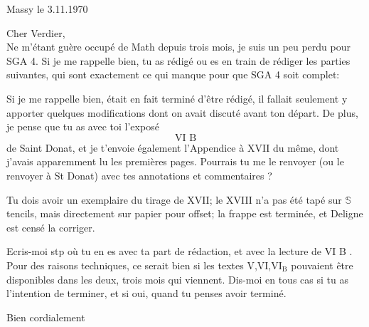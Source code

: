 \begin{flushright}
Massy le 3.11.1970\\
\end{flushright}
Cher Verdier,\\

Ne m'étant guère occupé de Math depuis trois mois, je suis un peu perdu pour SGA 4. Si je me rappelle bien, tu as rédigé ou es en train de rédiger les parties suivantes, qui sont exactement ce qui manque pour que SGA 4 soit complet:

Si je me rappelle bien,  était en fait terminé d'être rédigé, il fallait seulement y apporter quelques modifications dont on avait discuté avant ton départ. De plus, je pense que tu as avec toi l'exposé
\[
\text{VI B}
\]
de Saint Donat, et je t'envoie également l'Appendice à XVII du même, dont j'avais apparemment lu les premières pages. Pourrais tu me le renvoyer (ou le renvoyer à St Donat) avec tes annotations et commentaires ?

Tu dois avoir un exemplaire du tirage de XVII; le XVIII n'a pas été tapé sur \(\mathbb{S}\)tencils, mais directement sur papier pour offset; la frappe est terminée, et Deligne est censé la corriger.

Ecris-moi stp où tu en es avec ta part de rédaction, et avec la lecture de VI B .  Pour des raisons techniques, ce serait bien  si les textes V,VI,\(\mathrm{VI}_{\mathrm{B}}\) pouvaient être disponibles dans les deux, trois mois qui viennent. Dis-moi en tous cas si tu as l'intention de terminer, et si oui, quand tu penses avoir terminé.

Bien cordialement\\
